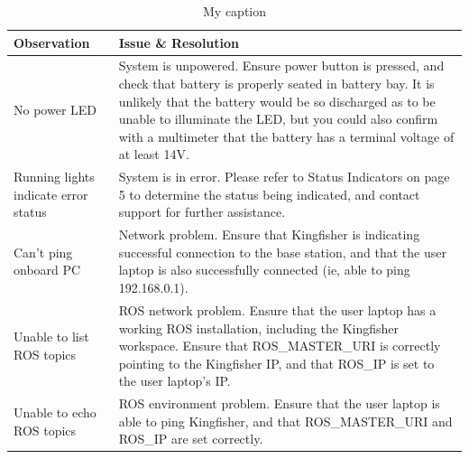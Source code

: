 \documentclass[]{clearpath-latex/clearpath-manual}
\begin{document}
\begin{enumerate}[nolistsep]
\begin{enumerate}[nolistsep]
\begin{table}[h]
\centering
\caption{My caption}
\label{my-label}
\begin{tabular}{ll}
\hline
{\bf Observation}                    & {\bf Issue \& Resolution}                                                                                                                                                                                                                                                                                          \\ \hline
No power LED                         & System is unpowered. Ensure power button is pressed, and check that battery is properly seated in battery bay. It is unlikely that the battery would be so discharged as to be unable to illuminate the LED, but you could also confirm with a multimeter that the battery has a terminal voltage of at least 14V. \\ \hline
Running lights indicate error status & System is in error. Please refer to Status Indicators on page 5 to determine the status being indicated, and contact support for further assistance.                                                                                                                                                               \\ \hline
Can’t ping onboard PC                & Network problem. Ensure that Kingfisher is indicating successful connection to the base station, and that the user laptop is also successfully connected (ie, able to ping 192.168.0.1).                                                                                                                           \\ \hline
Unable to list ROS topics            & ROS network problem. Ensure that the user laptop has a working ROS installation, including the Kingfisher workspace. Ensure that ROS\_MASTER\_URI is correctly pointing to the Kingfisher IP, and that ROS\_IP is set to the user laptop’s IP.                                                                     \\ \hline
Unable to echo ROS topics            & ROS environment problem. Ensure that the user laptop is able to ping Kingfisher, and that ROS\_MASTER\_URI and ROS\_IP are set correctly.                                                                                                                                                                          \\ \hline
\end{tabular}
\end{table}


\end{enumerate}
\end{enumerate}
\end{document}
